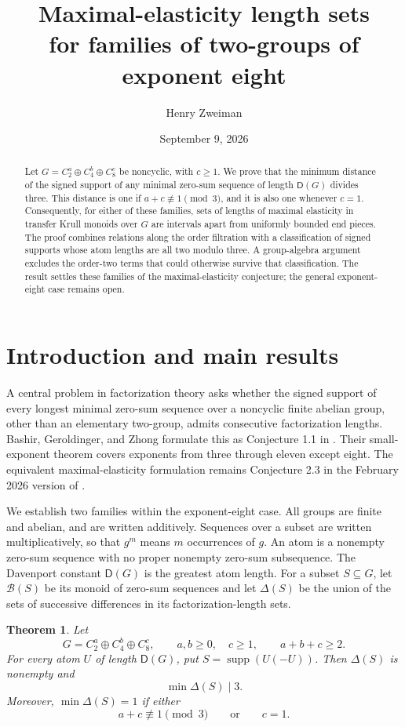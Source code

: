 \documentclass[11pt]{article}
\title{Maximal-elasticity length sets\protect\\for families of two-groups of exponent eight}
\author{Henry Zweiman}
\date{September 9, 2026}
\newtheorem{theorem}{Theorem}[section]
\theoremstyle{definition}
\newcommand{\D}{\mathsf D}
\newcommand{\supp}{\operatorname{supp}}
\begin{document}
\maketitle
\begin{abstract}
Let $G=C_2^a\oplus C_4^b\oplus C_8^c$ be noncyclic, with $c\geq1$. We prove that the minimum distance of the signed support of any minimal zero-sum sequence of length $\D(G)$ divides three. This distance is one if $a+c\not\equiv1\pmod3$, and it is also one whenever $c=1$. Consequently, for either of these families, sets of lengths of maximal elasticity in transfer Krull monoids over $G$ are intervals apart from uniformly bounded end pieces. The proof combines relations along the order filtration with a classification of signed supports whose atom lengths are all two modulo three. A group-algebra argument excludes the order-two terms that could otherwise survive that classification. The result settles these families of the maximal-elasticity conjecture; the general exponent-eight case remains open.
\end{abstract}

\section{Introduction and main results}

A central problem in factorization theory asks whether the signed support of every longest minimal zero-sum sequence over a noncyclic finite abelian group, other than an elementary two-group, admits consecutive factorization lengths. Bashir, Geroldinger, and Zhong formulate this as Conjecture 1.1 in \cite{BGZ}. Their small-exponent theorem covers exponents from three through eleven except eight. The equivalent maximal-elasticity formulation remains Conjecture 2.3 in the February 2026 version of \cite{Y}.

We establish two families within the exponent-eight case. All groups are finite and abelian, and are written additively. Sequences over a subset are written multiplicatively, so that $g^m$ means $m$ occurrences of $g$. An atom is a nonempty zero-sum sequence with no proper nonempty zero-sum subsequence. The Davenport constant $\D(G)$ is the greatest atom length. For a subset $S\subseteq G$, let $\mathcal B(S)$ be its monoid of zero-sum sequences and let $\Delta(S)$ be the union of the sets of successive differences in its factorization-length sets.

\begin{theorem}\label{thm:main}
Let
\[
 G=C_2^a\oplus C_4^b\oplus C_8^c,\qquad a,b\geq0,\quad c\geq1,
 \qquad a+b+c\geq2.
\]
For every atom $U$ of length $\D(G)$, put $S=\supp(U(-U))$. Then $\Delta(S)$ is nonempty and
\[
 \min\Delta(S)\mid3.
\]
Moreover, $\min\Delta(S)=1$ if either
\[
 a+c\not\equiv1\pmod3\qquad\text{or}\qquad c=1.
\]
\end{theorem}
\end{document}
